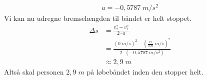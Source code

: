 \documentclass{report}
\begin{document}
\begin{equation*}
\begin{split}
  a=-0,5787 \;\unit{m/s^2}  
\end{split}
\end{equation*}
Vi kan nu udregne bremselængden til båndet er helt stoppet.
\begin{equation*}
\begin{split}
  \Delta s &=\frac{v_2^2-v_1^2}{2 \cdot a}\\
  &=\frac{\left(0 \;\unit{m/s} \right)^2 - \left(\frac{12}{3,6}\;\unit{m/s} \right)^2}{2 \cdot (-0,5787 \;\unit{m/s^2}) }\\
  &\approx 2,9 \;\unit{m} 
\end{split}
\end{equation*}
Altså skal personen $2,9 \;\unit{m} $ på løbebåndet inden den stopper helt. 
\end{document}
